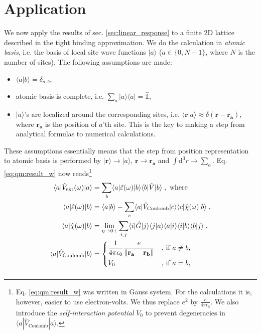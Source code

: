\documentclass[a4paper,12pt]{article}
\begin{document}
\section{Application}
    We now apply the results of sec. \ref{sec:linear_response} to a finite 2D lattice described in the tight binding approximation. We do the calculation in \textit{atomic basis}, i.e. the basis of local site wave functions $|a\rangle$ ($a \in \{0, N-1\}$, where $N$ is the number of sites). The following assumptions are made:
    \begin{itemize}
    \item $\langle a | b \rangle = \delta_{a,b}$,
    \item atomic basis is complete, i.e. $\sum_{a} |a\rangle\! \langle a| = \hat{\mathds{1}}$,
    \item $| a \rangle$'s are localized around the corresponding sites, i.e. $\langle \mathbf{r} | a \rangle \approx \delta(\mathbf{r} - \mathbf{r_a})$, where $\mathbf{r_a}$ is the position of $a$'th site. This is the key to making a step from analytical formulas to numerical calculations.
    \end{itemize}
    These assumptions essentially means that the step from position representation to atomic basis is performed by $|\mathbf{r}\rangle \to |a\rangle$, $\mathbf{r} \to \mathbf{r_a}$ and $\int\!\text{d}^3 r \to \sum_{a}$. Eq. \eqref{eq:qm:result_w} now reads\footnote{ %
Eq. \eqref{eq:qm:result_w} was written in Gauss system. For the calculations it is, however, easier to use electron-volts. We thus replace $e^2$ by $\frac{e}{4\pi\epsilon_0}$. We also introduce the \textit{self-interaction potential} $V_0$ to prevent degeneracies in $\langle a | \hat V_\text{Coulomb} | a \rangle$.
}
    \begin{equation} \label{eq:appl:result_w}
    \begin{aligned}
        \langle a | \hat V_\text{ext}(\omega) | a \rangle &= \sum_{b} \langle a | \hat \varepsilon(\omega) | b \rangle \langle b | \hat V | b \rangle \; , \text{ where} \\
        \langle a | \hat\varepsilon(\omega) | b \rangle
            &= \langle a | b \rangle - \sum_{c} \langle a | \hat V_\text{Coulomb} | c \rangle \langle c | \hat\chi(\omega) | b \rangle \; , \\
        \langle a | \hat \chi(\omega) | b \rangle 
            &= \lim_{\eta \to 0+} \sum_{i,j} \langle i | \hat G | j \rangle \langle j | a \rangle \langle a | i \rangle \langle i | b \rangle \langle b | j \rangle\; , \\
        \langle a | \hat V_\text{Coulomb} | b \rangle 
            &= \begin{dcases} 
                \frac{1}{4\pi\epsilon_0} \frac{e}{\|\mathbf{r_a} - \mathbf{r_b}\|} & \text{, if } a \neq b, \\
                V_0 & \text{, if } a = b,
                \end{dcases}
    \end{aligned}
    \end{equation}
        \begin{equation*}
    \end{equation*}
    
\end{document}
